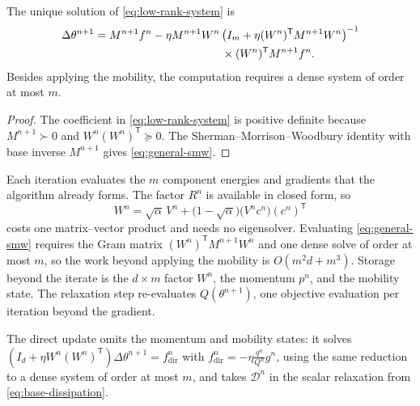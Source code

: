 \begin{proposition}
\label{prop:low-rank-solution}
The unique solution of \cref{eq:low-rank-system} is
\begin{equation}
\begin{aligned}
  \Delta\theta^{n+1}
  ={}&M^{n+1}f^n
  -\eta M^{n+1}W^n
  \left(I_m+\eta (W^n)^{\mathsf T}M^{n+1}W^n\right)^{-1}\\
  &\hspace{35mm}\times
  (W^n)^{\mathsf T}M^{n+1}f^n.
\end{aligned}
\label{eq:general-smw}
\end{equation}
Besides applying the mobility, the computation requires a dense system of
order at most \(m\).
\end{proposition}

\begin{proof}
The coefficient in \cref{eq:low-rank-system} is positive definite because
\(M^{n+1}\succ0\) and \(W^n(W^n)^{\mathsf T}\succeq0\).  The
Sherman--Morrison--Woodbury identity \cite{sherman1950,woodbury1950} with
base inverse \(M^{n+1}\) gives \cref{eq:general-smw}.
\end{proof}

\begin{remark}
\label{rem:cost}
Each iteration evaluates the \(m\) component energies and gradients that the
algorithm already forms.  The factor \(R^n\) is available in closed form, so
\[
  W^n=\sqrt{\alpha}\,V^n
  +\bigl(1-\sqrt{\alpha}\bigr)\bigl(V^nc^n\bigr)(c^n)^{\mathsf T}
\]
costs one matrix--vector product and needs no eigensolver.
Evaluating \cref{eq:general-smw} requires the Gram matrix
\((W^n)^{\mathsf T}M^{n+1}W^n\) and one dense solve of order at most \(m\),
so the work beyond applying the mobility is \(O(m^2d+m^3)\).  Storage beyond
the iterate is the \(d\times m\) factor \(W^n\), the momentum \(p^n\), and
the mobility state.  The relaxation step re-evaluates \(Q(\theta^{n+1})\),
one objective evaluation per iteration beyond the gradient.
\end{remark}


The direct update omits the momentum and mobility states: it solves
\(\left(I_d+\eta W^n(W^n)^{\mathsf T}\right)\Delta\theta^{n+1}
=f_{\mathrm{dir}}^n\) with
\(f_{\mathrm{dir}}^n=-\eta\frac{q^n}{Q^n}g^n\), using the same reduction to a
dense system of order at most \(m\), and takes \(\mathcal D^n\) in the scalar
relaxation from \cref{eq:base-dissipation}.

